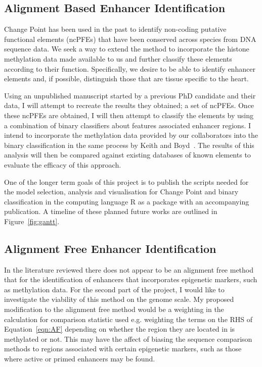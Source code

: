\subsection{Alignment Based Enhancer Identification}

Change Point has been used in the past to identify non-coding putative functional elements (ncPFEs) that have been conserved across species from DNA sequence data. We seek a way to extend the method to incorporate the histone methylation data made available to us and further classify these elements according to their function. Specifically, we desire to be able to identify enhancer elements and, if possible, distinguish those that are tissue specific to the heart.

Using an unpublished manuscript started by a previous PhD candidate and their data, I will attempt to recreate the results they obtained; a set of ncPFEs. Once these ncPFEs are obtained, I will then attempt to classify the elements by using a combination of binary classifiers about features associated enhancer regions. I intend to incorporate the methylation data provided by our collaborators into the binary classification in the same process by Keith and Boyd~\cite{keith2012bayesian}. The results of this analysis will then be compared against existing databases of known elements to evaluate the efficacy of this approach. 

One of the longer term goals of this project is to publish the scripts needed for the model selection, analysis and visualisation for Change Point and binary classification in the computing language R as a package with an accompanying publication. A timeline of these planned future works are outlined in Figure~\ref{fig:gantt}.


\subsection{Alignment Free Enhancer Identification}

In the literature reviewed there does not appear to be an alignment free method that for the identification of enhancers that incorporates epigenetic markers, such as methylation data. For the second part of the project, I would like to investigate the viability of this method on the genome scale. My proposed modification to the alignment free method would be a weighting in the calculation for comparison statistic used e.g. weighting the terms on the RHS of Equation~\ref{eqn:AF} depending on whether the region they are located in is methylated or not. This may have the affect of biasing the sequence comparison methods to regions associated with certain epigenetic markers, such as those where active or primed enhancers may be found.

